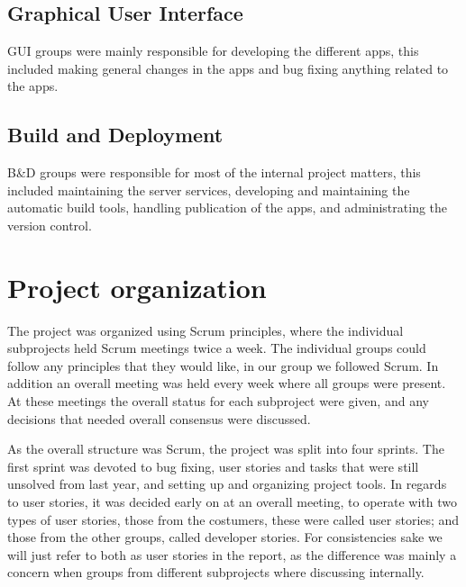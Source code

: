 \subsection{Graphical User Interface}
GUI groups were mainly responsible for developing the different apps, this included making general changes in the apps and bug fixing anything related to the apps.

\subsection{Build and Deployment}
B\&D groups were responsible for most of the internal project matters, this included maintaining the server services, developing and maintaining the automatic build tools, handling publication of the apps, and administrating the version control.

\section{Project organization}
The project was organized using Scrum principles, where the individual subprojects held Scrum meetings twice a week. The individual groups could follow any principles that they would like, in our group we followed Scrum.
In addition an overall meeting was held every week where all groups were present. At these meetings the overall status for each subproject were given, and any decisions that needed overall consensus were discussed.

As the overall structure was Scrum, the project was split into four sprints. The first sprint was devoted to bug fixing, user stories and tasks that were still unsolved from last year, and setting up and organizing project tools. In regards to user stories, it was decided early on at an overall meeting, to operate with two types of user stories, those from the costumers, these were called user stories; and those from the other groups, called developer stories. For consistencies sake we will just refer to both as user stories in the report, as the difference was mainly a concern when groups from different subprojects where discussing internally.

